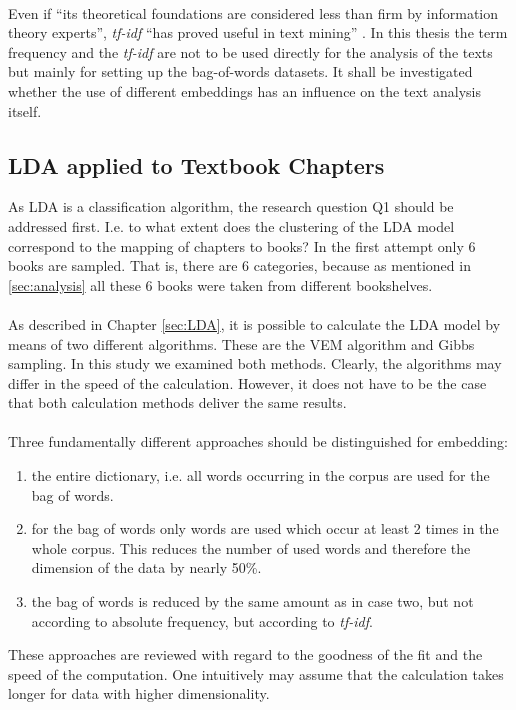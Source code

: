 \documentclass[11pt,a4paper]{article}
\begin{document}
\ \\
Even if “its theoretical foundations are considered less than firm by information theory experts”, \textit{tf-idf} “has proved useful in text mining” \cite{Silge2017}. In this thesis the term frequency and the \textit{tf-idf} are not to be used directly for the analysis of the texts but mainly for setting up the bag-of-words datasets. It shall be investigated whether the use of different embeddings has an influence on the text analysis itself.

\subsection{LDA applied to Textbook Chapters} \label{Example1}

As LDA is a classification algorithm, the research question Q1 should be addressed first. I.e. to what extent does the clustering of the LDA model correspond to the mapping of chapters to books? In the first attempt only 6 books are sampled. That is, there are 6 categories, because as mentioned in \ref{sec:analysis} all these 6 books were taken from different bookshelves.\\
\ \\
As described in Chapter \ref{sec:LDA}, it is possible to calculate the LDA model by means of two different algorithms. These are the VEM algorithm and Gibbs sampling. In this study we examined both methods. Clearly, the algorithms may differ in the speed of the calculation. However, it does not have to be the case that both calculation methods deliver the same results.\\
\ \\
Three fundamentally different approaches should be distinguished for embedding:
\begin{enumerate}
	\item the entire dictionary, i.e. all words occurring in the corpus are used for the bag of words.	
	\item for the bag of words only words are used which occur at least 2 times in the whole corpus. This reduces the number of used words and therefore the dimension of the data by nearly 50\%.
	\item the bag of words is reduced by the same amount as in case two, but not according to absolute frequency, but according to \textit{tf-idf}.
\end{enumerate}
These approaches are reviewed with regard to the goodness of the fit and the speed of the computation. One intuitively may assume that the calculation takes longer for data with higher dimensionality.\\
\end{document}
